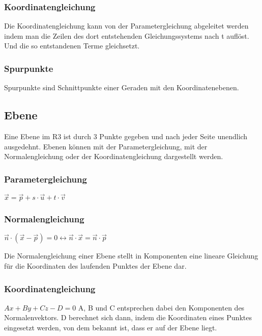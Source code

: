 \documentclass[11pt,a4paper,onecolumn]{scrartcl}
\begin{document}
\begin{flushleft}
\subsubsection{Koordinatengleichung}
Die Koordinatengleichung kann von der Parametergleichung abgeleitet werden indem man die Zeilen des dort entstehenden Gleichungssystems nach t auflöst. Und die so entstandenen Terme gleichsetzt. \linebreak
\newline

\subsubsection{Spurpunkte}
Spurpunkte sind Schnittpunkte einer Geraden mit den Koordinatenebenen.

\subsection{Ebene}
Eine Ebene im R3 ist durch 3 Punkte gegeben und nach jeder Seite unendlich ausgedehnt. Ebenen können mit der Parametergleichung, mit der Normalengleichung oder der Koordinatengleichung dargestellt werden.

\subsubsection{Parametergleichung}
$ \vec{x} = \vec{p} + s \cdot \vec{u} + t \cdot \vec{v}$
\subsubsection{Normalengleichung}
$ \vec{n} \cdot (\vec{x}-\vec{p}) = 0 \leftrightarrow \vec{n}\cdot \vec{x} = \vec{n} \cdot \vec{p} $ \linebreak

Die Normalengleichung einer Ebene stellt in Komponenten eine lineare Gleichung für die Koordinaten des laufenden Punktes der Ebene dar. \linebreak\linebreak
\subsubsection{Koordinatengleichung}
$Ax+By+Cz-D = 0 $ \linebreak
A, B und C entsprechen dabei den Komponenten des Normalenvektors. D berechnet sich dann, indem die Koordinaten eines Punktes eingesetzt werden, von dem bekannt ist, dass er auf der Ebene liegt.


\end{flushleft}
\end{document}
